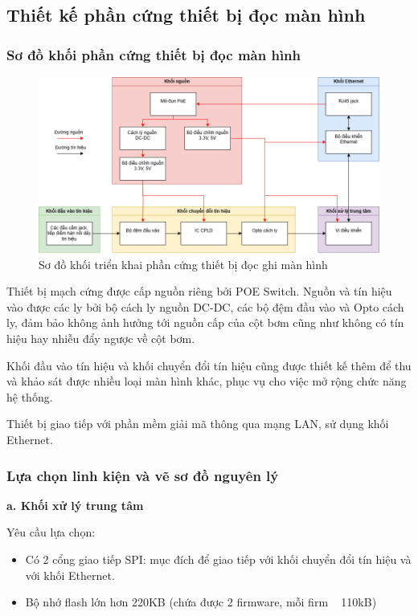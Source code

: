 \subsection{Thiết kế phần cứng thiết bị đọc màn hình}

\subsubsection{Sơ đồ khối phần cứng thiết bị đọc màn hình}


\begin{figure}[!ht]
    \centering
    \includegraphics[width=1.0\linewidth]{Figures/Chap3_Device-Hardware-implementation-function-block.png}
    \caption{Sơ đồ khối triển khai phần cứng thiết bị đọc ghi màn hình}
    \label{fig:hinh3.4}
\end{figure}

Thiết bị mạch cứng được cấp nguồn riêng bởi POE Switch. Nguồn và tín hiệu vào được các ly bởi bộ cách ly nguồn DC-DC, các bộ đệm đầu vào và Opto cách ly, đảm bảo không ảnh hưởng tới nguồn cấp của cột bơm cũng như không có tín hiệu hay nhiễu đẩy ngược về cột bơm.

Khối đầu vào tín hiệu và khối chuyển đổi tín hiệu cũng được thiết kế thêm để thu và khảo sát được nhiều loại màn hình khác, phục vụ cho việc mở rộng chức năng hệ thống.

Thiết bị giao tiếp với phần mềm giải mã thông qua mạng LAN, sử dụng khối Ethernet.

\subsubsection{Lựa chọn linh kiện và vẽ sơ đồ nguyên lý}

\textbf{a.  Khối xử lý trung tâm}

 Yêu cầu lựa chọn:
\begin{itemize}
    \item Có 2 cổng giao tiếp SPI: mục đích để giao tiếp với khối chuyển đổi tín hiệu và với khối Ethernet. 
    \item Bộ nhớ flash lớn hơn 220KB (chứa được 2 firmware, mỗi firm ~ 110kB)
\end{itemize}

